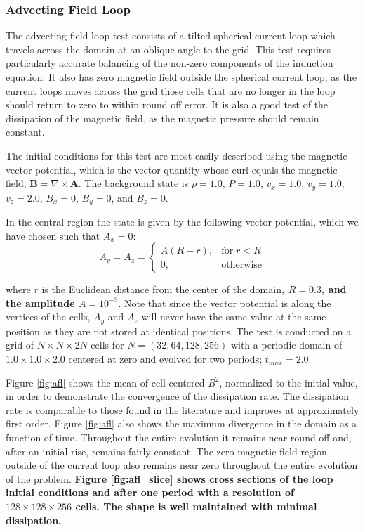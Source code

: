 \documentclass[modern, linenumbers]{aastex631}
\begin{document}
\subsubsection{Advecting Field Loop}
\label{sec:afl}

The advecting field loop test consists of a tilted spherical current loop which travels across the domain at an oblique angle to the grid. This test requires particularly accurate balancing of the non-zero components of the induction equation. It also has zero magnetic field outside the spherical current loop; as the current loops moves across the grid those cells that are no longer in the loop should return to zero to within round off error. It is also a good test of the dissipation of the magnetic field, as the magnetic pressure should remain constant.

The initial conditions for this test are most easily described using the magnetic vector potential, which is the vector quantity whose curl equals the magnetic field, $\boldsymbol{B} = \nabla \times\boldsymbol{A}$. The background state is
$\rho = 1.0$,
$P = 1.0$,
$v_x = 1.0$,
$v_y = 1.0$,
$v_z = 2.0$,
$B_x = 0$,
$B_y = 0$, and
$B_z = 0$.

In the central region the state is given by the following vector potential, which we have chosen such that $A_x = 0$:
\begin{equation}
    A_y = A_z =
    \begin{cases}
        A \left( R - r \right),& \text{for}\; r < R\\
        0,              & \text{otherwise}
    \end{cases}
\end{equation}

\noindent where $r$ is the Euclidean distance from the center of the domain\textbf{, $R = 0.3$, and the amplitude $A=10^{-3}$}. Note that since the vector potential is along the vertices of the cells, $A_y$ and $A_z$ will never have the same value at the same position as they are not stored at identical positions. The test is conducted on a grid of $N\times N\times 2N$ cells for $N=(32, 64, 128, 256)$ with a periodic domain of $1.0\times1.0\times2.0$ centered at zero and evolved for two periods; $t_{max} = 2.0$.

Figure \ref{fig:afl} shows the mean of cell centered $B^2$, normalized to the initial value, in order to demonstrate the convergence of the dissipation rate. The dissipation rate is comparable to those found in the literature \citep{stone_athena_2008} and improves at approximately first order. Figure \ref{fig:afl} also shows the maximum divergence in the domain as a function of time. Throughout the entire evolution it remains near round off and, after an initial rise, remains fairly constant. The zero magnetic field region outside of the current loop also remains near zero throughout the entire evolution of the problem. \textbf{Figure \ref{fig:afl_slice} shows cross sections of the loop initial conditions and after one period with a resolution of $128\times128\times256$ cells. The shape is well maintained with minimal dissipation.}
\end{document}

